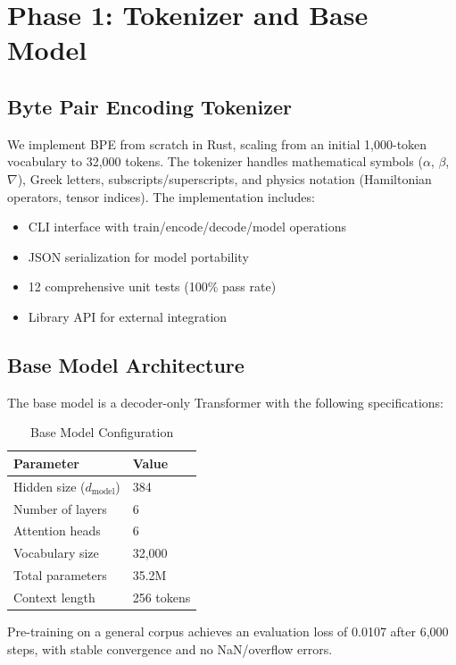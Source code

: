 \documentclass[11pt,a4paper]{article}
\begin{document}
\section{Phase 1: Tokenizer and Base Model}

\subsection{Byte Pair Encoding Tokenizer}

We implement BPE from scratch in Rust, scaling from an initial 1,000-token vocabulary to 32,000 tokens. The tokenizer handles mathematical symbols ($\alpha$, $\beta$, $\nabla$), Greek letters, subscripts/superscripts, and physics notation (Hamiltonian operators, tensor indices). The implementation includes:

\begin{itemize}[leftmargin=*]
    \item CLI interface with train/encode/decode/model operations
    \item JSON serialization for model portability
    \item 12 comprehensive unit tests (100\% pass rate)
    \item Library API for external integration
\end{itemize}

\subsection{Base Model Architecture}

The base model is a decoder-only Transformer with the following specifications:

\begin{table}[h]
\centering
\caption{Base Model Configuration}
\begin{tabular}{ll}
\toprule
\textbf{Parameter} & \textbf{Value} \\
\midrule
Hidden size ($d_{\text{model}}$) & 384 \\
Number of layers & 6 \\
Attention heads & 6 \\
Vocabulary size & 32,000 \\
Total parameters & 35.2M \\
Context length & 256 tokens \\
\bottomrule
\end{tabular}
\end{table}

Pre-training on a general corpus achieves an evaluation loss of 0.0107 after 6,000 steps, with stable convergence and no NaN/overflow errors.
\end{document}
